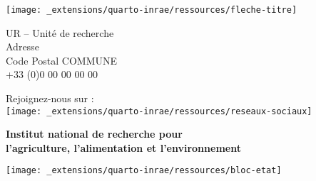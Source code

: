 
\thispagestyle{empty}


\begin{center}

\color{inrae}

\vspace*{10cm}

\texttt{[image: \_extensions/quarto-inrae/ressources/fleche-titre]}\par

\sffamily
UR -- Unité de recherche\\
Adresse\\
Code Postal COMMUNE\\
+33 (0)0 00 00 00 00\par\bigskip

Rejoignez-nous sur :\\
\texttt{[image: \_extensions/quarto-inrae/ressources/reseaux-sociaux]}\par\bigskip

\vspace*{2cm}

{\bfseries Institut national de recherche pour\\
l'agriculture, l'alimentation et l'environnement}\par\bigskip

\texttt{[image: \_extensions/quarto-inrae/ressources/bloc-etat]}\par

\end{center}

\restoregeometry
